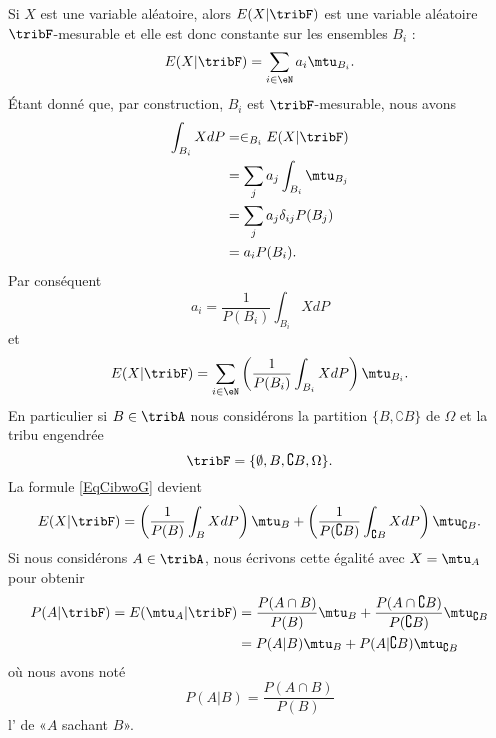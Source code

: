 Si \( X\) est une variable aléatoire, alors \( E(X|\tribF)\) est une variable aléatoire \( \tribF\)-mesurable et elle est donc constante sur les ensembles \( B_i\) :
\begin{equation}
    E(X|\tribF)=\sum_{i\in\eN}a_i\mtu_{B_i}.
\end{equation}
Étant donné que, par construction, \( B_i\) est \( \tribF\)-mesurable, nous avons 
\begin{subequations}
    \begin{align}
        \int_{B_i}XdP&=\in_{B_i}E(X|\tribF)\\
        &=\sum_ja_j\int_{B_i}\mtu_{B_j}\\
        &=\sum_ja_j\delta_{ij}P(B_j)\\
        &=a_iP(B_i).
    \end{align}
\end{subequations}
Par conséquent
\begin{equation}
    a_i=\frac{1}{ P(B_i) }\int_{B_i}XdP
\end{equation}
et
\begin{equation}    \label{EqCibwoG}
    E(X|\tribF)=\sum_{i\in \eN}\left( \frac{1}{ P(B_i) }\int_{B_i}XdP \right)\mtu_{B_i}.
\end{equation}
En particulier si \( B\in \tribA\) nous considérons la partition \( \{ B,\complement B \}\) de \( \Omega\) et la tribu engendrée
\begin{equation}
    \tribF=\{ \emptyset,B,\complement B,\Omega \}.
\end{equation}
La formule \eqref{EqCibwoG} devient
\begin{equation}
    E(X|\tribF)=\left( \frac{1}{ P(B) }\int_BXdP \right)\mtu_B+\left( \frac{1}{ P(\complement B) }\int_{\complement B}XdP \right)\mtu_{\complement B}.
\end{equation}
Si nous considérons \( A\in\tribA\), nous écrivons cette égalité avec \( X=\mtu_A\) pour obtenir
\begin{subequations}
    \begin{align}
        P(A|\tribF)=E(\mtu_A|\tribF)&=\frac{ P(A\cap B) }{ P(B) }\mtu_B+\frac{ P(A\cap\complement B) }{ P(\complement B) }\mtu_{\complement B}\\
        &=P(A|B)\mtu_B+P(A|\complement B)\mtu_{\complement B}
    \end{align}
\end{subequations}
où nous avons noté
\begin{equation}
    P(A|B)=\frac{ P(A\cap B) }{ P(B) }
\end{equation}
l' de «\( A\) sachant \( B\)».

